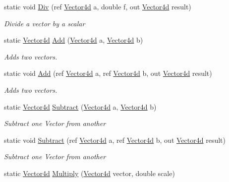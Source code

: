\begin{DoxyCompactItemize}
static void \hyperlink{struct_open_t_k_1_1_vector4d_ae5dc63d426bbc8aa58f21d23b08edd23}{Div} (ref \hyperlink{struct_open_t_k_1_1_vector4d}{Vector4d} a, double f, out \hyperlink{struct_open_t_k_1_1_vector4d}{Vector4d} result)
\begin{DoxyCompactList}\small\item\em Divide a vector by a scalar \end{DoxyCompactList}\item 
static \hyperlink{struct_open_t_k_1_1_vector4d}{Vector4d} \hyperlink{struct_open_t_k_1_1_vector4d_aba358315b48973ffdd80836a8185c588}{Add} (\hyperlink{struct_open_t_k_1_1_vector4d}{Vector4d} a, \hyperlink{struct_open_t_k_1_1_vector4d}{Vector4d} b)
\begin{DoxyCompactList}\small\item\em Adds two vectors. \end{DoxyCompactList}\item 
static void \hyperlink{struct_open_t_k_1_1_vector4d_ac96886abb288bef6a2f0134eaeea545e}{Add} (ref \hyperlink{struct_open_t_k_1_1_vector4d}{Vector4d} a, ref \hyperlink{struct_open_t_k_1_1_vector4d}{Vector4d} b, out \hyperlink{struct_open_t_k_1_1_vector4d}{Vector4d} result)
\begin{DoxyCompactList}\small\item\em Adds two vectors. \end{DoxyCompactList}\item 
static \hyperlink{struct_open_t_k_1_1_vector4d}{Vector4d} \hyperlink{struct_open_t_k_1_1_vector4d_abb4c63506315cd9e8595593c4383690d}{Subtract} (\hyperlink{struct_open_t_k_1_1_vector4d}{Vector4d} a, \hyperlink{struct_open_t_k_1_1_vector4d}{Vector4d} b)
\begin{DoxyCompactList}\small\item\em Subtract one Vector from another \end{DoxyCompactList}\item 
static void \hyperlink{struct_open_t_k_1_1_vector4d_a725b9546209748cdfea177dcf8565b01}{Subtract} (ref \hyperlink{struct_open_t_k_1_1_vector4d}{Vector4d} a, ref \hyperlink{struct_open_t_k_1_1_vector4d}{Vector4d} b, out \hyperlink{struct_open_t_k_1_1_vector4d}{Vector4d} result)
\begin{DoxyCompactList}\small\item\em Subtract one Vector from another \end{DoxyCompactList}\item 
static \hyperlink{struct_open_t_k_1_1_vector4d}{Vector4d} \hyperlink{struct_open_t_k_1_1_vector4d_a6a6106ad04842e56a4c206d395b59a69}{Multiply} (\hyperlink{struct_open_t_k_1_1_vector4d}{Vector4d} vector, double scale)

\end{DoxyCompactItemize}
